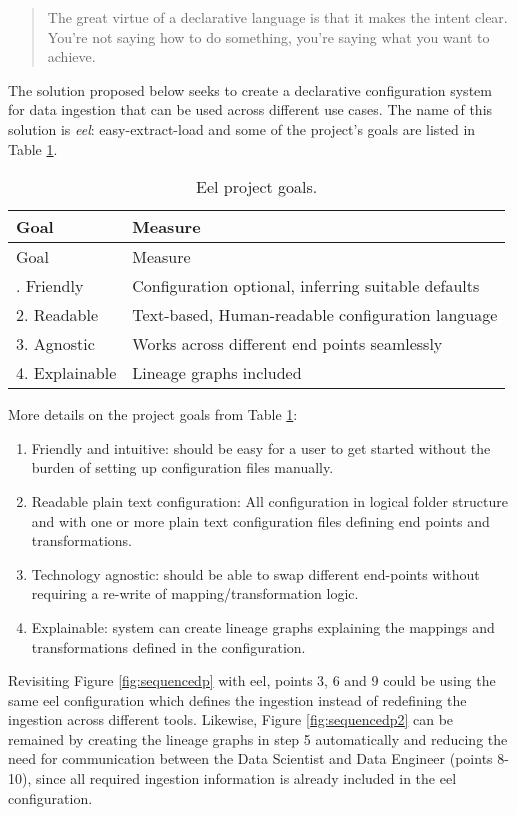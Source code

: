 \begin{quote}
The great virtue of a declarative language is that it makes the intent
clear. You're not saying how to do something, you're saying what you
want to achieve. \citep[p.~39]{patterns_eaa}
\end{quote}

The solution proposed below seeks to create a declarative configuration
system for data ingestion that can be used across different use cases.
The name of this solution is \emph{eel}: easy-extract-load and some of
the project's goals are listed in Table \ref{tbl:goals}.

\begin{longtable}[]{@{}ll@{}}
\caption{\label{tbl:goals}Eel project goals.}\tabularnewline
\toprule\noalign{}
Goal & Measure \\
\midrule\noalign{}
\endfirsthead
\toprule\noalign{}
Goal & Measure \\
\midrule\noalign{}
\endhead
\bottomrule\noalign{}
\endlastfoot
1. Friendly & Configuration optional, inferring suitable defaults \\
2. Readable & Text-based, Human-readable configuration language \\
3. Agnostic & Works across different end points seamlessly \\
4. Explainable & Lineage graphs included \\
\end{longtable}

More details on the project goals from Table \ref{tbl:goals}:

\begin{enumerate}
\def\labelenumi{\arabic{enumi}.}
\tightlist
\item
  Friendly and intuitive: should be easy for a user to get started
  without the burden of setting up configuration files manually.
\item
  Readable plain text configuration: All configuration in logical folder
  structure and with one or more plain text configuration files defining
  end points and transformations.
\item
  Technology agnostic: should be able to swap different end-points
  without requiring a re-write of mapping/transformation logic.
\item
  Explainable: system can create lineage graphs explaining the mappings
  and transformations defined in the configuration.
\end{enumerate}

Revisiting Figure \ref{fig:sequencedp} with eel, points 3, 6 and 9 could
be using the same eel configuration which defines the ingestion instead
of redefining the ingestion across different tools. Likewise, Figure
\ref{fig:sequencedp2} can be remained by creating the lineage graphs in
step 5 automatically and reducing the need for communication between the
Data Scientist and Data Engineer (points 8-10), since all required
ingestion information is already included in the eel configuration.

